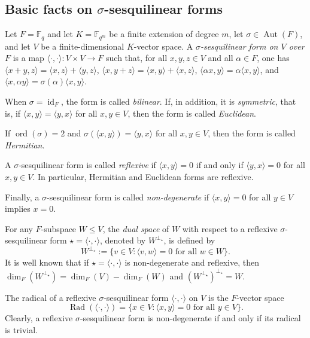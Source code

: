 \documentclass[11pt]{article}
\begin{document}
\subsection{Basic facts on $\sigma$-sesquilinear forms}



Let $F=\mathbb{F}_q$ and let $K=\mathbb{F}_{q^m}$ be a finite extension of degree $m$, let $\sigma\in\operatorname{Aut}(F)$, and let $V$ be a finite-dimensional $K$-vector space. A \textit{$\sigma$-sesquilinear form on $V$ over $F$} is a map $\langle\cdot,\cdot\rangle:V\times V\longrightarrow F$ such that, for all $x,y,z\in V$ and all $\alpha\in F$, one has
$\langle x+y,z\rangle=\langle x,z\rangle+\langle y,z\rangle$,
$\langle x,y+z\rangle=\langle x,y\rangle+\langle x,z\rangle$,
$\langle \alpha x,y\rangle=\alpha\langle x,y\rangle$,
and
$\langle x,\alpha y\rangle=\sigma(\alpha)\langle x,y\rangle$.

When $\sigma=\operatorname{id}_F$, the form is called \emph{bilinear}. If, in addition, it is \emph{symmetric}, that is, if $\langle x,y\rangle=\langle y,x\rangle$ for all $x,y\in V$, then the form is called \emph{Euclidean}.

If $\operatorname{ord}(\sigma)=2$ and $\sigma(\langle x,y\rangle)=\langle y,x\rangle$ for all $x,y\in V$, then the form is called \textit{Hermitian}.

A $\sigma$-sesquilinear form is called \textit{reflexive} if $\langle x,y\rangle=0$ if and only if $\langle y,x\rangle=0$ for all $x,y\in V$. In particular, Hermitian and Euclidean forms are reflexive.

Finally, a $\sigma$-sesquilinear form is called \textit{non-degenerate} if $\langle x,y\rangle=0$ for all $y\in V$ implies $x=0$.




For any $F$-subspace $W\leq V$, the \textit{dual space} of $W$ with respect to a reflexive $\sigma$-sesquilinear form $\star=\langle\cdot,\cdot\rangle$, denoted by $W^{\perp_{\star}}$, is defined by
$$
W^{\perp_{\star}}:=\{v\in V:\langle v,w\rangle=0 \text{ for all } w\in W\}.
$$
 It is well known that if $\star=\langle\cdot,\cdot\rangle$ is non-degenerate and reflexive, then
$
\dim_F(W^{\perp_{\star}})=\dim_F(V)-\dim_F(W)
$
and
$
(W^{\perp_{\star}})^{\perp_{\star}}=W.
$

The radical of a reflexive $\sigma$-sesquilinear form $\langle\cdot,\cdot\rangle$ on $V$ is the $F$-vector space
$$
\operatorname{Rad}(\langle\cdot,\cdot\rangle)=\{x\in V:\langle x,y\rangle=0 \text{ for all } y\in V\}.
$$
Clearly, a reflexive $\sigma$-sesquilinear form is non-degenerate if and only if its radical is trivial.
\end{document}
